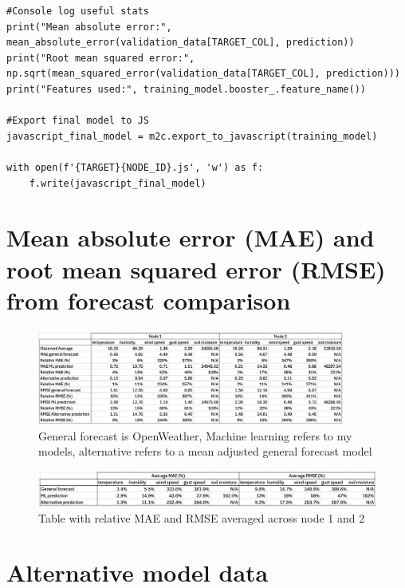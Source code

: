 \begin{multicols}{2}
\begin{lstlisting}
#Console log useful stats
print("Mean absolute error:", mean_absolute_error(validation_data[TARGET_COL], prediction))
print("Root mean squared error:", np.sqrt(mean_squared_error(validation_data[TARGET_COL], prediction)))
print("Features used:", training_model.booster_.feature_name())

#Export final model to JS
javascript_final_model = m2c.export_to_javascript(training_model)

with open(f'{TARGET}{NODE_ID}.js', 'w') as f:
    f.write(javascript_final_model)

    \end{lstlisting}
\end{multicols}

\section{Mean absolute error (MAE) and root mean squared error (RMSE) from
forecast comparison}\label{app:ml-stats}

\begin{figure}[H]
    \centering
    \includegraphics[width=0.9\textwidth]{contents/appendix/fig5/mae-rmse.png}
    \caption{General forecast is OpenWeather, Machine learning refers to my models, alternative refers to a mean adjusted general forecast model}
    \label{fig:mae-rmse}
\end{figure}

\begin{figure}[H]
    \centering
    \includegraphics[width=1\textwidth]{contents/appendix/fig5/rel-mae-rmse.png}
    \caption{Table with relative MAE and RMSE averaged across node 1 and 2}
    \label{fig:rel-mae-rmse}
\end{figure}

\section{Alternative model data}

